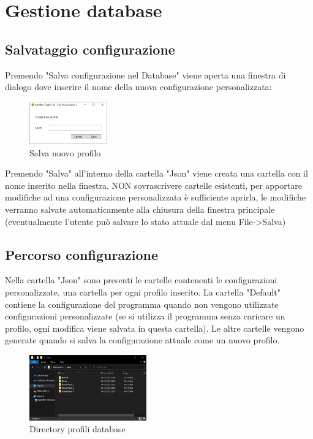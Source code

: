 
\chapter{Gestione database}

\section{Salvataggio configurazione}

Premendo "Salva configurazione nel Database" viene aperta una finestra di dialogo dove inserire il
nome della nuova configurazione personalizzata:

\begin{figure}[H]
\centering
\includegraphics[width=0.3\textwidth]{../Img/SaveProfile.PNG}
\caption{Salva nuovo profilo}
\end{figure}

Premendo "Salva" all'interno della cartella "Json" viene creata una cartella con il nome inserito
nella finestra. NON sovrascrivere cartelle esistenti, per apportare modifiche ad una configurazione
personalizzata è sufficiente aprirla, le modifiche verranno salvate automaticamente alla chiusura
della finestra principale (eventualmente l'utente può salvare lo stato attuale dal menu File->Salva)

\section{Percorso configurazione}

Nella cartella "Json" sono presenti le cartelle contenenti le configurazioni personalizzate, una cartella
per ogni profilo inserito. La
cartella "Default" contiene la configurazione del programma quando non vengono utilizzate
configurazioni personalizzate (se si utilizza il programma senza caricare un profilo, ogni
modifica viene salvata in questa cartella). Le altre cartelle vengono generate quando si salva la
configurazione attuale come un nuovo profilo.

\begin{figure}[H]
\centering
\includegraphics[width=0.45\textwidth]{../Img/DatabaseDirectory.PNG}
\caption{Directory profili database}
\end{figure}

